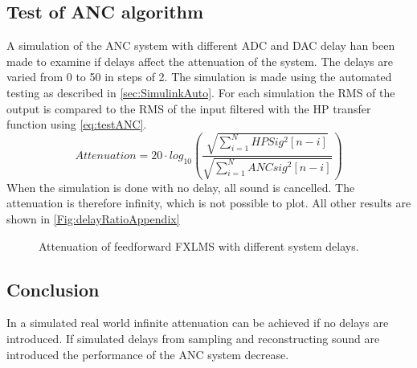 \subsection{Test of ANC algorithm}
A simulation of the ANC system with different ADC and DAC delay han been made to examine if delays affect the attenuation of the system. The delays are varied from 0 to 50 in steps of 2. The simulation is made using the automated testing as described in \autoref{sec:SimulinkAuto}. For each simulation the RMS of the output is compared to the RMS of the input filtered with the HP transfer function using \autoref{eq:testANC}.
\begin{equation}\label{eq:testANC}
	Attenuation=20 \cdot log_{10}\left (\frac{\sqrt{\sum\limits_{i=1}^{N}HPSig^2[n-i]}}{\sqrt{\sum\limits_{i=1}^{N}ANCsig^2[n-i]}}  \right )
\end{equation}
When the simulation is done with no delay, all sound is cancelled. The attenuation is therefore infinity, which is not possible to plot. All other results are shown in \autoref{Fig:delayRatioAppendix}

\begin{figure}[H]
	\centering
	
	\caption{Attenuation of feedforward FXLMS with different system delays.}
	\label{Fig:delayRatioAppendix}
\end{figure}

\subsection{Conclusion}
In a simulated real world infinite attenuation can be achieved if no delays are introduced. If simulated delays from sampling and reconstructing sound are introduced the performance of the ANC system decrease.